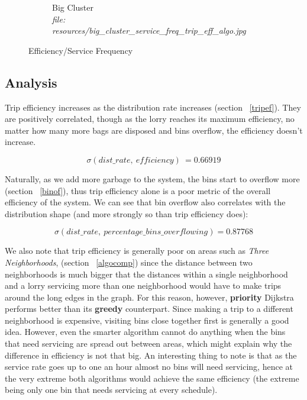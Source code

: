 \documentclass{article}
\begin{document}
\begin{figure}[H]
\begin{subfigure}[b]{.5\textwidth}
				\caption{Big Cluster\\\textit{file: resources/big\_cluster\_service\_freq\_trip\_eff\_algo.jpg}}
				\label{fig:fig9b}
			\end{subfigure}
			\label{fig:fig9}
			\caption{Efficiency/Service Frequency}
		\end{figure}

		\subsection{Analysis}
		Trip efficiency increases as the distribution rate increases (section ~\ref{tripef}). They are positively correlated, though
		as the lorry reaches its maximum efficiency, no matter how many more bags are disposed and bins overflow,
		the efficiency doesn't increase.
		
		\begin{equation}
			\sigma(dist\_rate,\ efficiency)\ = 0.66919
		\end{equation} 

		Naturally, as we add more garbage to the system, the bins start to overflow more (section ~\ref{binof}), thus trip efficiency alone
		is a poor metric of the overall efficiency of the system. We can see that bin overflow also correlates with
		the distribution shape (and more strongly so than trip efficiency does):

		\begin{equation}
			\sigma(dist\_rate,\ percentage\_bins\_overflowing) = 0.87768
		\end{equation}

		We also note that trip efficiency is generally poor on areas such as \textit{Three Neighborhoods}, (section ~\ref{algocomp}) since
		the distance between two neighborhoods is much bigger that the distances within a single neighborhood and a lorry servicing
		more than one neighborhood would have to make trips around the long edges in the graph.
		For this reason, however, \textbf{priority} Dijkstra performs better than its \textbf{greedy} counterpart.
		Since making a trip to a different neighborhood is expensive, visiting bins close together first is generally
		a good idea. However, even the smarter algorithm cannot do anything when the bins that need servicing are
		spread out between areas, which might explain why the difference in efficiency is not that big.
		An interesting thing to note is that as the service rate goes up to one an hour almost no bins will need
		servicing, hence at the very extreme both algorithms would achieve the same efficiency (the extreme being only
		one bin that needs servicing at every schedule).
\end{document}
